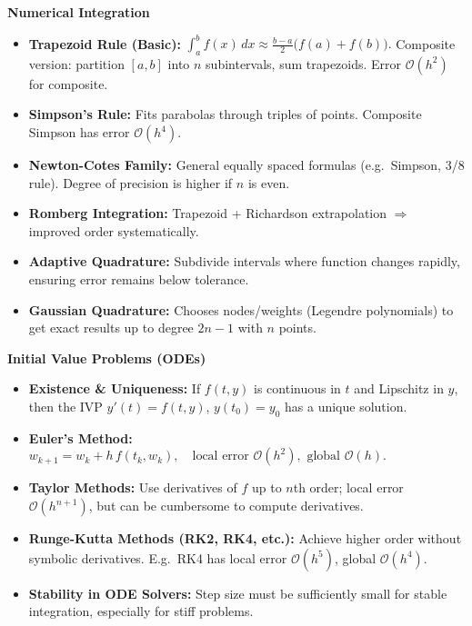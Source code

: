 \documentclass[9pt,letterpaper]{article}
\begin{document}
\begin{multicols*}{3}
  \noindent
  \textbf{\large Numerical Integration}
  \begin{itemize}
    \item \textbf{Trapezoid Rule (Basic):} 
      $
      \int_a^b f(x)\,dx \approx \frac{b-a}{2}\bigl(f(a)+f(b)\bigr).
      $
      Composite version: partition $[a,b]$ into $n$ subintervals, sum trapezoids. Error $\mathcal{O}(h^2)$ for composite.
    \item \textbf{Simpson's Rule:} Fits parabolas through triples of points. Composite Simpson has error $\mathcal{O}(h^4)$.
    \item \textbf{Newton-Cotes Family:} General equally spaced formulas (e.g.\ Simpson, 3/8 rule). Degree of precision is higher if $n$ is even.
    \item \textbf{Romberg Integration:} Trapezoid + Richardson extrapolation $\Rightarrow$ improved order systematically.
    \item \textbf{Adaptive Quadrature:} Subdivide intervals where function changes rapidly, ensuring error remains below tolerance.
    \item \textbf{Gaussian Quadrature:} Chooses nodes/weights (Legendre polynomials) to get exact results up to degree $2n-1$ with $n$ points.
  \end{itemize}

  \noindent
  \textbf{\large Initial Value Problems (ODEs)}
  \begin{itemize}
    \item \textbf{Existence \& Uniqueness:} If $f(t,y)$ is continuous in $t$ and Lipschitz in $y$, then the IVP $y'(t)=f(t,y)$, $y(t_0)=y_0$ has a unique solution.
    \item \textbf{Euler's Method:} 
      $
      w_{k+1} = w_k + h\,f(t_k, w_k), 
      \quad \text{local error }\mathcal{O}(h^2), \text{ global }\mathcal{O}(h).
      $
    \item \textbf{Taylor Methods:} Use derivatives of $f$ up to $n$th order; local error $\mathcal{O}(h^{n+1})$, but can be cumbersome to compute derivatives.
    \item \textbf{Runge-Kutta Methods (RK2, RK4, etc.):} Achieve higher order without symbolic derivatives. 
      E.g.\ RK4 has local error $\mathcal{O}(h^5)$, global $\mathcal{O}(h^4)$.
    \item \textbf{Stability in ODE Solvers:} Step size must be sufficiently small for stable integration, especially for stiff problems.
  \end{itemize}


\end{multicols*}
\end{document}
